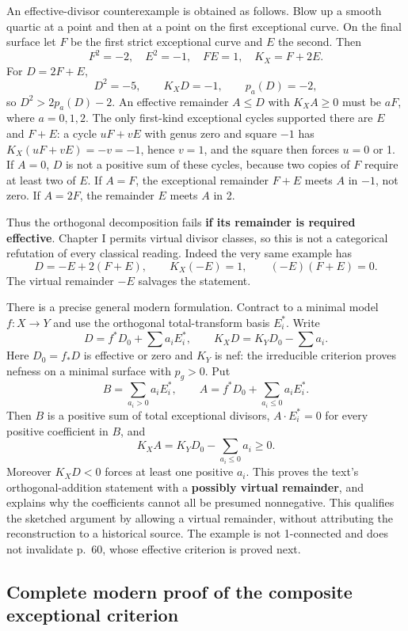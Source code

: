 An effective-divisor counterexample is obtained as follows. Blow up a smooth quartic at a point and then at a point on the first exceptional curve. On the final surface let \(F\) be the first strict exceptional curve and \(E\) the second. Then \[
F^2=-2,\quad E^2=-1,\quad FE=1,\quad K_X=F+2E.
\] For \(D=2F+E\), \[
D^2=-5,\qquad K_X D=-1,\qquad p_a(D)=-2,
\] so \(D^2>2p_a(D)-2\). An effective remainder \(A\le D\) with \(K_X A\ge0\) must be \(aF\), where \(a=0,1,2\). The only first-kind exceptional cycles supported there are \(E\) and \(F+E\): a cycle \(uF+vE\) with genus zero and square \(-1\) has \(K_X(uF+vE)=-v=-1\), hence \(v=1\), and the square then forces \(u=0\) or 1. If \(A=0\), \(D\) is not a positive sum of these cycles, because two copies of \(F\) require at least two of \(E\). If \(A=F\), the exceptional remainder \(F+E\) meets \(A\) in \(-1\), not zero. If \(A=2F\), the remainder \(E\) meets \(A\) in 2.

Thus the orthogonal decomposition fails \textbf{if its remainder is required effective}. Chapter I permits virtual divisor classes, so this is not a categorical refutation of every classical reading. Indeed the very same example has \[
D=-E+2(F+E),\qquad K_X(-E)=1,\qquad(-E)(F+E)=0.
\] The virtual remainder \(-E\) salvages the statement.

There is a precise general modern formulation. Contract to a minimal model \(f:X\to Y\) and use the orthogonal total-transform basis \(E_i^*\). Write \[
D=f^*D_0+\sum a_iE_i^*,\qquad
K_XD=K_YD_0-\sum a_i.
\] Here \(D_0=f_*D\) is effective or zero and \(K_Y\) is nef: the irreducible criterion proves nefness on a minimal surface with \(p_g>0\). Put \[
B=\sum_{a_i>0}a_iE_i^*,\qquad
A=f^*D_0+\sum_{a_i\le0}a_iE_i^*.
\] Then \(B\) is a positive sum of total exceptional divisors, \(A\cdot E_i^*=0\) for every positive coefficient in \(B\), and \[
K_XA=K_YD_0-\sum_{a_i\le0}a_i\ge0.
\] Moreover \(K_XD<0\) forces at least one positive \(a_i\). This proves the text's orthogonal-addition statement with a \textbf{possibly virtual remainder}, and explains why the coefficients cannot all be presumed nonnegative. This qualifies the sketched argument by allowing a virtual remainder, without attributing the reconstruction to a historical source. The example is not 1-connected and does not invalidate p.~60, whose effective criterion is proved next.

\subsection{Complete modern proof of the composite exceptional criterion}

